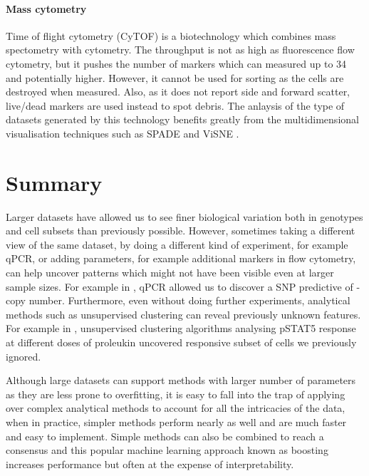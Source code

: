 \paragraph{Mass cytometry}

Time of flight cytometry (CyTOF) is a biotechnology which combines mass spectometry with cytometry.
The throughput is not as high as fluorescence flow cytometry, but it pushes the number of markers which can measured up to 34 and potentially higher.
However, it cannot be used for sorting as the cells are destroyed when measured.
Also, as it does not report side and forward scatter, live/dead markers are used instead to spot debris.
The anlaysis of the type of datasets generated by this technology benefits greatly from the multidimensional visualisation techniques such as \gls{SPADE} \citep{Simonds:2011jh} and ViSNE \citep{Amir:2013jp}.


\section{Summary}

Larger datasets have allowed us to see finer biological variation both in genotypes and cell subsets than previously possible.
However, sometimes taking a different view of the same dataset, by doing a different kind of experiment, for example qPCR, or adding parameters, for example additional markers in flow cytometry, can help uncover patterns which might not have been visible even at larger sample sizes.
For example in , qPCR allowed us to discover a SNP predictive of - copy number.
Furthermore, even without doing further experiments, analytical methods such as unsupervised clustering can reveal previously unknown features.
For example in , unsupervised clustering algorithms analysing pSTAT5 response at different doses of proleukin uncovered responsive subset of cells we previously ignored.

Although large datasets can support methods with larger number of parameters as they are less prone to overfitting,
it is easy to fall into the trap of applying over complex analytical methods to account for all the intricacies of the data,
when in practice, simpler methods perform nearly as well and are much faster and easy to implement.
Simple methods can also be combined to reach a consensus and this popular machine learning approach known as boosting increases performance but often at the expense of interpretability.


